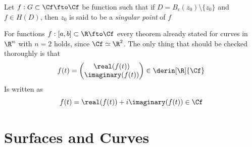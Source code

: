 \documentclass[../mmf.tex]{subfiles}
\begin{document}
\begin{dfn}
	Let $f:G\subset\Cf\fto\Cf$ be function such that if $D=B_\epsilon(z_0)\setminus\{z_0\}$ and $f\in H(D)$, then $z_0$ is said to be a \textit{singular point} of $f$
\end{dfn}
%
For functions $f:[a,b]\subset\R\fto\Cf$ every theorem already stated for curves in $\R^n$ with $n=2$ holds, since $\Cf\simeq\R^2$. The only thing that should be checked thoroughly is that
\begin{equation*}
	f(t)=\begin{pmatrix}\real(f(t))\\\imaginary(f(t))\end{pmatrix}\in\derin[\R]{\Cf}
\end{equation*}
Is written as
\begin{equation*}
	f(t)=\real(f(t))+i\imaginary(f(t))\in\Cf
\end{equation*}
\section{Surfaces and Curves}
\end{document}

